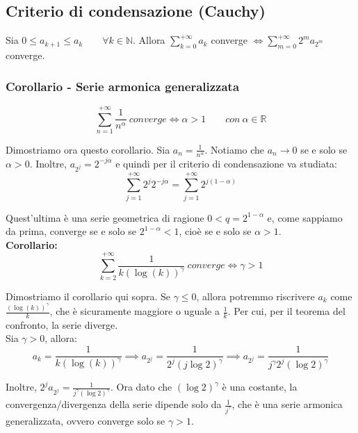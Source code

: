\documentclass{article}
\begin{document}
\subsection{Criterio di condensazione (Cauchy)}
Sia $0 \leq a_{k + 1} \leq a_k \qquad \forall k \in \mathbb{N}$. Allora $\sum_{k = 0}^{+\infty} a_k$ converge $\iff \sum_{m = 0}^{+\infty} 2^m a_{2^m}$ converge.

\subsubsection{Corollario - Serie armonica generalizzata}
\begin{equation*}
    \sum_{n = 1}^{+\infty} \frac{1}{n^\alpha} \ converge \iff \alpha > 1 \qquad con \ \alpha \in \mathbb{R}
\end{equation*}

\noindent Dimostriamo ora questo corollario. Sia $a_n = \frac{1}{n^\alpha}$. Notiamo che $a_n \to 0$ se e solo se $\alpha > 0$. Inoltre, $a_{2^j} = 2^{-j\alpha}$ e quindi per il criterio di condensazione va studiata:
\begin{equation*}
    \sum_{j = 1}^{+\infty}2^j 2^{-j\alpha} = \sum_{j = 1}^{+\infty} 2^{j(1 - \alpha)}
\end{equation*}

\noindent Quest'ultima è una serie geometrica di ragione $0 < q = 2^{1 - \alpha}$ e, come sappiamo da prima, converge se e solo se $2^{1 - \alpha} < 1$, cioè se e solo se $\alpha > 1$.\\

\noindent\textbf{Corollario:}
\begin{equation*}
    \sum_{k = 2}^{+\infty} \frac{1}{k(\log(k))^\gamma} \ converge \iff \gamma > 1
\end{equation*}

\noindent Dimostriamo il corollario qui sopra. Se $\gamma \leq 0$, allora potremmo riscrivere $a_k$ come $\frac{(\log(k))^\gamma}{k}$, che è sicuramente maggiore o uguale a $\frac{1}{k}$. Per cui, per il teorema del confronto, la serie diverge.\\
Sia $\gamma > 0$, allora:
\begin{equation*}
    a_k = \frac{1}{k(\log(k))^\gamma} \implies a_{2^j} = \frac{1}{2^j(j\log2)^\gamma} \implies a_{2^j} = \frac{1}{j^\gamma2^j(\log2)^\gamma}
\end{equation*}

\noindent Inoltre, $2^j a_{2^j} = \frac{1}{j^\gamma(\log2)^\gamma}$. Ora dato che $(\log2)^\gamma$ è una costante, la convergenza/divergenza della serie dipende solo da $\frac{1}{j^\gamma}$, che è una serie armonica generalizzata, ovvero converge solo se $\gamma > 1$.
\end{document}
